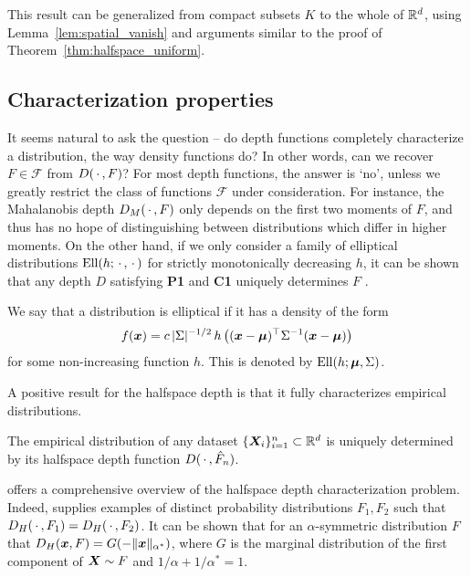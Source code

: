 \begin{remark}
    This result can be generalized from compact subsets $K$ to the whole of
    $\mathbb{R}^d$, using Lemma~\ref{lem:spatial_vanish} and arguments similar to the
    proof of Theorem~\ref{thm:halfspace_uniform}.
\end{remark}



\subsection{Characterization properties}

It seems natural to ask the question -- do depth functions completely
characterize a distribution, the way density functions do?
In other words, can we recover $F \in \mathscr{F}$ from $D(\,\cdot\,, F)$?
For most depth functions, the answer is `no', unless we greatly restrict the
class of functions $\mathscr{F}$ under consideration.
For instance, the Mahalanobis depth $D_M(\,\cdot\,, F)$ only depends on the first
two moments of $F$, and thus has no hope of distinguishing between
distributions which differ in higher moments.
On the other hand, if we only consider a family of elliptical distributions
$\operatorname{Ell}(h; \,\cdot\,, \,\cdot\,)$ for strictly monotonically decreasing $h$, it can be
shown that any depth $D$ satisfying \textbf{P1} and \textbf{C1} uniquely
determines $F$ \parencite{mosler-mozharovskyi-2022}.


\begin{definition}
    \label{def:elliptical}
    We say that a distribution is elliptical if it has a density of the form
    \begin{equation}
        f(\bm{x}) = c\, |\Sigma|^{-1/2}\, h\left((\bm{x} - \bm{\mu})^\top \Sigma^{-1} (\bm{x} - \bm{\mu})\right)
    \end{equation}
    for some non-increasing function $h$.
    This is denoted by $\operatorname{Ell}(h; \bm{\mu}, \Sigma)$.
\end{definition}


A positive result for the halfspace depth is that it fully characterizes
empirical distributions.

\begin{theorem}
    The empirical distribution of any dataset $\{\bm{X}_i\}_{i = 1}^n \subset
    \mathbb{R}^d$ is uniquely determined by its halfspace depth function $D(\,\cdot\,,
    \hat{F}_n)$.
\end{theorem}

\textcite{nagy-2020} offers a comprehensive overview of the halfspace depth
characterization problem.
Indeed, \textcite{nagy-2021} supplies examples of distinct probability
distributions $F_1, F_2$ such that $D_H(\,\cdot\,, F_1) = D_H(\,\cdot\,, F_2)$.
It can be shown that for an $\alpha$-symmetric distribution $F$ that $D_H(\bm{x},
F) = G(-\Vert \bm{x} \Vert_{\alpha^*})$, where $G$ is the marginal distribution of the
first component of $\bm{X} \sim F$ and $1/\alpha + 1/\alpha^* = 1$.


